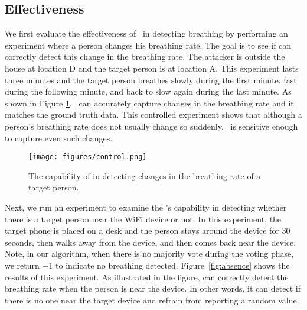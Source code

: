 \subsection{Effectiveness}
\label{sec:results}

We first evaluate the effectiveness of \wisneak\  in detecting breathing by performing an experiment where a person changes his breathing rate. The goal is to see if \wisneak can correctly detect this change in the breathing rate. The attacker is outside the house at location D and the target person is at location A. This experiment lasts three minutes and the target person breathes slowly during the first minute, fast during the following minute, and back to slow again during the last minute. As shown in Figure \ref{fig:change}, \wisneak\  can accurately capture changes in the breathing rate and it matches the ground truth data. This controlled experiment shows that although a person's breathing rate does not usually change so suddenly, \wisneak\  is sensitive enough to capture even such changes. 

\begin{figure}
    \centering
    \texttt{[image: figures/control.png]}
    \caption{The capability of \wisneak in detecting changes in the breathing rate of a target person.}
    \label{fig:change}
\end{figure}

Next, we run an experiment to examine the \wisneak's capability in detecting whether there is a target person near the WiFi device or not. In this experiment, the target phone is placed on a desk and the person stays around the device for $30$ seconds, then walks away from the device, and then comes back near the device. Note, in our algorithm, when there is no majority vote during the voting phase, we return $-1$ to indicate no breathing detected. Figure~\ref{fig:absence} shows the results of this experiment. As illustrated in the figure, \wisneak can correctly detect the breathing rate when the person is near the device. In other words, it can detect if there is no one near the target device and refrain from reporting a random value.

